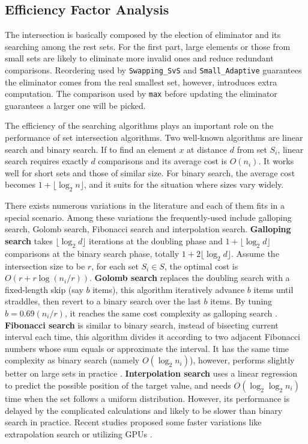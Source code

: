 \documentclass[runningheads,a4paper]{llncs}
\begin{document}
\subsection{Efficiency Factor Analysis}\label{sec: factor}
The intersection is basically composed by the election of eliminator and its searching among the rest sets.
For the first part, large elements or those from small sets are likely to eliminate more invalid ones and reduce redundant comparisons.
Reordering used by \texttt{Swapping\_SvS} and \texttt{Small\_Adaptive} guarantees the eliminator comes from the real smallest set, however, introduces extra computation.
The comparison used by \texttt{max} before updating the eliminator guarantees a larger one will be picked.

The efficiency of the searching algorithms plays an important role on the performance of set intersection algorithms.
Two well-known algorithms are linear search and binary search.
If to find an element $ x $ at distance $ d $ from set $ S_i $, linear search requires exactly $ d $ comparisons and its average cost is $ O(n_i) $.
It works well for short sets and those of similar size.
For binary search, the average cost becomes $ 1 + \lfloor \log_2 n \rfloor $, and it suits for the situation where sizes vary widely.

There exists numerous variations in the literature and each of them fits in a special scenario.
Among these variations the frequently-used include galloping search, Golomb search, Fibonacci search and interpolation search.
\textbf{Galloping search} takes $ \lfloor \log_2 d \rfloor $ iterations at the doubling phase and $ 1 + \lfloor \log_2 d \rfloor $ comparisons at the binary search phase, totally $ 1 + 2 \lfloor \log_2 d \rfloor $.
Assume the intersection size to be $ r $, for each set $ S_i \in S$, the optimal cost is $ O(r+r\log (n_i/r)) $.
\textbf{Golomb search} replaces the doubling search with a fixed-length skip (say $ b $ items), this algorithm iteratively advance $ b $ items until straddles, then revert to a binary search over the last $ b $ items.
By tuning $ b =0.69(n_i/r) $, it reaches the same cost complexity as galloping search \cite{Hwang1972A}.
\textbf{Fibonacci search} is similar to binary search, instead of bisecting current interval each time, this algorithm divides it according to two adjacent Fibonacci numbers whose sum equals or approximate the interval.
It has the same time complexity as binary search (namely $ O(\log_2 n_i) $), however, performs slightly better on large sets in practice \cite{Kiefer1953Sequential}.
\textbf{Interpolation search} uses a linear regression to predict the possible position of the target value, and needs $ O(\log_2\log_2 n_i) $ time when the set follows a uniform distribution.
However, its performance is delayed by the complicated calculations and likely to be slower than binary search in practice.
Recent studies proposed some faster variations like extrapolation search or utilizing GPUs \cite{Ao2011Efficient,Barbay2003Optimality}.
\end{document}
